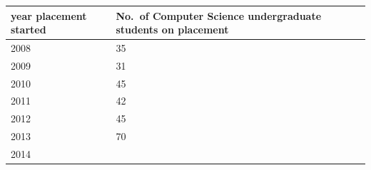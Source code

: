 \documentclass[
  12pt,
]{book}
\begin{document}
\begin{longtable}[]{@{}ll@{}}
\toprule
\begin{minipage}[b]{0.47\columnwidth}\raggedright
year placement started\strut
\end{minipage} & \begin{minipage}[b]{0.47\columnwidth}\raggedright
No.~of Computer Science undergraduate students on placement\strut
\end{minipage}\tabularnewline
\midrule
\endhead
\begin{minipage}[t]{0.47\columnwidth}\raggedright
2008\strut
\end{minipage} & \begin{minipage}[t]{0.47\columnwidth}\raggedright
35\strut
\end{minipage}\tabularnewline
\begin{minipage}[t]{0.47\columnwidth}\raggedright
2009\strut
\end{minipage} & \begin{minipage}[t]{0.47\columnwidth}\raggedright
31\strut
\end{minipage}\tabularnewline
\begin{minipage}[t]{0.47\columnwidth}\raggedright
2010\strut
\end{minipage} & \begin{minipage}[t]{0.47\columnwidth}\raggedright
45\strut
\end{minipage}\tabularnewline
\begin{minipage}[t]{0.47\columnwidth}\raggedright
2011\strut
\end{minipage} & \begin{minipage}[t]{0.47\columnwidth}\raggedright
42\strut
\end{minipage}\tabularnewline
\begin{minipage}[t]{0.47\columnwidth}\raggedright
2012\strut
\end{minipage} & \begin{minipage}[t]{0.47\columnwidth}\raggedright
45\strut
\end{minipage}\tabularnewline
\begin{minipage}[t]{0.47\columnwidth}\raggedright
2013\strut
\end{minipage} & \begin{minipage}[t]{0.47\columnwidth}\raggedright
70\strut
\end{minipage}\tabularnewline
\begin{minipage}[t]{0.47\columnwidth}\raggedright
2014\strut
\end{minipage} & \begin{minipage}[t]{0.47\columnwidth}\raggedright

\end{minipage}
\end{longtable}
\end{document}
